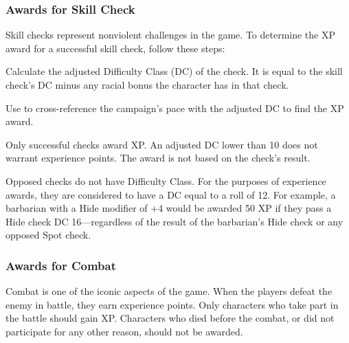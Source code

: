 \subsubsection{Awards for Skill Check}
Skill checks represent nonviolent challenges in the game. To determine the XP award for a successful skill check, follow these steps:

\begin{enumerate*}
	\item Calculate the adjusted Difficulty Class (DC) of the check. It is equal to the skill check's DC minus any racial bonus the character has in that check.
	\item Use  to cross-reference the campaign's pace with the adjusted DC to find the XP award.
\end{enumerate*}
 
Only successful checks award XP. An adjusted DC lower than 10 does not warrant experience points. The award is not based on the check's result.

Opposed checks do not have Difficulty Class. For the purposes of experience awards, they are considered to have a DC equal to a roll of 12. For example, a barbarian with a Hide modifier of +4 would be awarded 50 XP if they pass a Hide check DC 16---regardless of the result of the barbarian's Hide check or any opposed Spot check.


\subsubsection{Awards for Combat}
Combat is one of the iconic aspects of the game. When the players defeat the enemy in battle, they earn experience points. Only characters who take part in the battle should gain XP. Characters who died before the combat, or did not participate for any other reason, should not be awarded.

